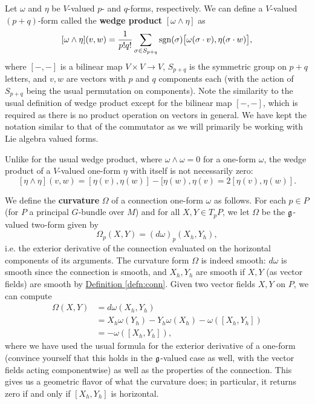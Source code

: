 \begin{defn}
    \label{defn:wedge}
    Let $\omega$ and $\eta$ be $V$-valued $p$- and $q$-forms, respectively. We can define a $V$-valued $(p+q)$-form
    called the \textbf{wedge product} $[\omega\wedge\eta]$ as
    \[ [\omega\wedge\eta](v,w)=\frac{1}{p!q!}\sum_{\sigma\in S_{p+q}}\operatorname{sgn}(\sigma)\big[\omega(\sigma\cdot v),\eta(\sigma\cdot w)\big],\]
    where $[-,-]$ is a bilinear map $V\times V\to V$, $S_{p+q}$ is the symmetric group on $p+q$ letters,
    and $v,w$ are vectors with $p$ and $q$ components each (with the action of $S_{p+q}$ being the usual permutation on components).
    Note the similarity to the usual definition of wedge product except for the bilinear map $[-,-]$, which
    is required as there is no product operation on vectors in general. We have kept the notation similar to
    that of the commutator as we will primarily be working with Lie algebra valued forms.
\end{defn}

\begin{rmk}
    Unlike for the usual wedge product, where $\omega\wedge\omega=0$ for a one-form $\omega$, the wedge product of a
    $V$-valued one-form $\eta$ with itself is not necessarily zero:
    \[ [\eta\wedge\eta](v,w)=[\eta(v),\eta(w)]-[\eta(w),\eta(v)=2[\eta(v),\eta(w)].\]
\end{rmk}

\begin{defn}
We define the \textbf{curvature} $\Omega$ of a connection one-form $\omega$ as follows. For each $p\in P$ (for $P$ a principal $G$-bundle over $M$) and for all $X,Y\in T_pP$, we let $\Omega$ be the $\mathfrak g$-valued two-form given by
\[\Omega_p(X,Y)=(d\omega)_p(X_h,Y_h),\]
i.e. the exterior derivative of the connection evaluated on the horizontal components of its arguments. The curvature form $\Omega$
is indeed smooth: $d\omega$ is smooth since the connection is smooth, and $X_h,Y_h$ are smooth if $X,Y$ (as vector fields) are smooth
by \hyperref[defn:conn]{Definition \ref*{defn:conn}}. Given two vector fields $X,Y$ on $P$, we can compute
\begin{align*}
    \Omega(X,Y)&=d\omega(X_h,Y_h)\\
    &=X_h\omega(Y_h)-Y_h\omega(X_h)-\omega([X_h,Y_h])\\
    &=-\omega([X_h,Y_h]),
\end{align*}
where we have used the usual formula for the exterior derivative of a one-form (convince yourself that this holds in the $\mathfrak g$-valued
case as well, with the vector fields acting componentwise) as well as the properties of the connection. This gives us a geometric flavor
of what the curvature does; in particular, it returns zero if and only if $[X_h,Y_h]$ is horizontal.
\end{defn}

